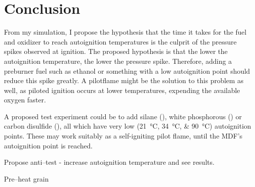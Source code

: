 \chapter{Conclusion}

From my simulation, I propose the hypothesis that the time it takes for the fuel and oxidizer to reach autoignition temperatures is the culprit of the pressure spikes observed at ignition. The proposed hypothesis is that the lower the autoignition temperature, the lower the pressure spike. Therefore, adding a preburner fuel such as ethanol or something with a low autoignition point should reduce this spike greatly. A pilotflame might be the solution to this problem as well, as piloted ignition occurs at lower temperatures, expending the available oxygen faster.

A proposed test experiment could be to add silane (), white phosphorous () or carbon disulfide (), all which have very low (\SIlist{21;34;90}{\celsius}) autoignition points. These may work suitably as a self-igniting pilot flame, until the MDF's autoignition point is reached.


Propose anti--test - increase autoignition temperature and see results.

Pre--heat grain
